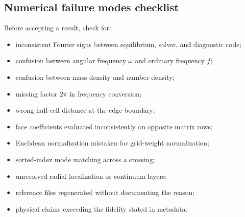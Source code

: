 \subsection{Numerical failure modes checklist}
Before accepting a result, check for:
\begin{itemize}[leftmargin=1.6em]
\item inconsistent Fourier signs between equilibrium, solver, and diagnostic code;
\item confusion between angular frequency $\omega$ and ordinary frequency $f$;
\item confusion between mass density and number density;
\item missing factor $2\pi$ in frequency conversion;
\item wrong half-cell distance at the edge boundary;
\item face coefficients evaluated inconsistently on opposite matrix rows;
\item Euclidean normalization mistaken for grid-weight normalization;
\item sorted-index mode matching across a crossing;
\item unresolved radial localization or continuum layers;
\item reference files regenerated without documenting the reason;
\item physical claims exceeding the fidelity stated in metadata.
\end{itemize}
